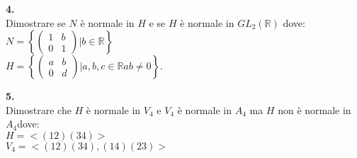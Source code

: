 \documentclass[italian,a4paper,11pt]
{article}
\newcommand{\R}{\mathbb{R}}
\newcommand{\acc}{\`}
\begin{document}
\vspace{0.2cm}
\noindent
\begin{Ex}\textbf{ 4.}\\
Dimostrare  se $N$ \acc e normale in $H$ e se $H$ \acc e normale in $GL_2(\R)$ dove:\\ 
$N=\left\{ \left(\begin{array}{cc}1 &b\\0 & 1\end{array}\right) | b\in \R\right\}$\\
$H=\left\{ \left(\begin{array}{cc}a&b\\0 & d\end{array}\right) | a,b,c\in \R ab\neq 0 \right\}.$
\end{Ex}


\vspace{0.2cm}
\noindent
\begin{Ex}\textbf{ 5.}\\
Dimostrare  che $H$ \acc e normale in $V_4$ e $V_4$ \acc e normale in $A_4$ ma $H$ non \acc e normale in $A_4$dove:\\ 
$H=<(12)(34)>$\\
$V_4=<(12)(34),(14)(23)>$
\end{Ex}


		
\end{document}
